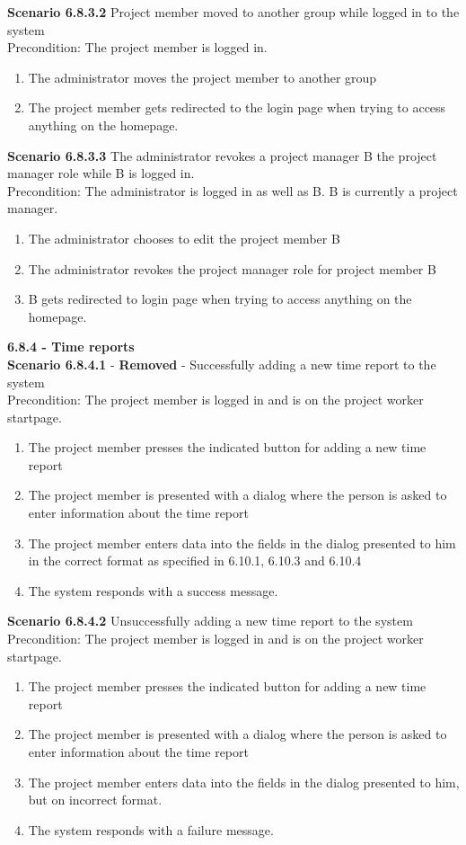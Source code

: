 \documentclass{article}
\begin{document}
\noindent\textbf{Scenario 6.8.3.2} Project member moved to another group while logged in to the system \\
Precondition: The project member is logged in.
\begin{enumerate}
\item The administrator moves the project member to another group
\item The project member gets redirected to the login page when trying to access anything on the homepage.
\end{enumerate}

\noindent\textbf{Scenario 6.8.3.3} The administrator revokes a project manager B the project manager role while B is logged in.\\
Precondition: The administrator is logged in as well as B. B is currently a project manager.
\begin{enumerate}
\item The administrator chooses to edit the project member B
\item The administrator revokes the project manager role for project member B
\item B gets redirected to login page when trying to access anything on the homepage.\\
\end{enumerate}

\noindent
{\fontsize{11}{11}\selectfont \noindent\textbf{6.8.4 - Time reports}} \\
\noindent\textbf{Scenario 6.8.4.1} - \textbf{Removed} - Successfully adding a new time report to the system \\
Precondition: The project member is logged in and is on the project worker startpage.
\begin{enumerate}
\item The project member presses the indicated button for adding a new time report
\item The project member is presented with a dialog where the person is asked to enter information about the time report
\item The project member enters data into the fields in the dialog presented to him in the correct format as specified in 6.10.1, 6.10.3 and 6.10.4
\item The system responds with a success message.
\end{enumerate}

\noindent\textbf{Scenario 6.8.4.2} Unsuccessfully adding a new time report to the system \\
Precondition: The project member is logged in and is on the project worker startpage.
\begin{enumerate}
\item The project member presses the indicated button for adding a new time report
\item The project member is presented with a dialog where the person is asked to enter information about the time report
\item The project member enters data into the fields in the dialog presented to him, but on incorrect format.
\item The system responds with a failure message.
\end{enumerate}
\end{document}
